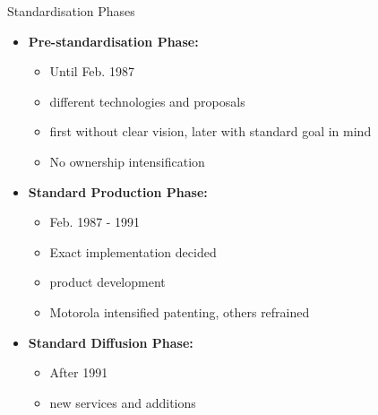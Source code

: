 \begin{frame}{Standardisation Phases}
  \begin{itemize}
    \item \textbf{Pre-standardisation Phase:}
    \begin{itemize}
      \item Until Feb. 1987
      \item different technologies and proposals
      \item first without clear vision, later with standard goal in mind
      \item No ownership intensification
    \end{itemize}
    \item \textbf{Standard Production Phase:}
    \begin{itemize}
      \item Feb. 1987 - 1991
      \item Exact implementation decided
      \item product development
      \item Motorola intensified patenting, others refrained
    \end{itemize}
    \item \textbf{Standard Diffusion Phase:}
    \begin{itemize}
      \item After 1991
      \item new services and additions
    \end{itemize}
  \end{itemize}
\end{frame}
